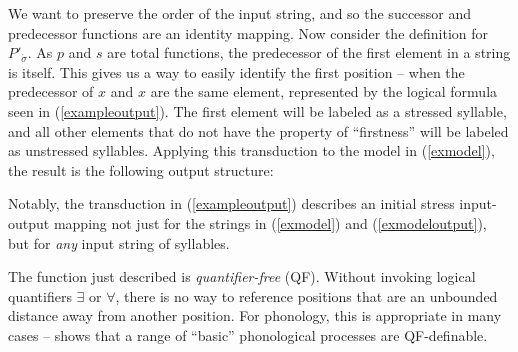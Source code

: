 \documentclass[12pt]{article}
\newcommand{\sig}{\sigma}
\newcommand{\ass}{\acute{\sig}}
\begin{document}
We want to preserve the order of the input string, and so the successor and predecessor functions are an identity mapping. Now consider the definition for $P'_\ass$. As $p$ and $s$ are total functions, the predecessor of the first element in a string is itself. This gives us a way to easily identify the first position -- when the predecessor of $x$ and $x$ are the same element, represented by the logical formula seen in (\ref{exampleoutput}). The first element will be labeled as a stressed syllable, and all other elements that do not have the property of ``firstness'' will be labeled as unstressed syllables. Applying this transduction to the model in (\ref{exmodel}), the result is the following output structure: 

\begin{exe}
\item 

 \label{exmodeloutput}
\end{exe}

\noindent
Notably, the transduction in (\ref{exampleoutput}) describes an initial stress input-output mapping not just for the strings in (\ref{exmodel}) and (\ref{exmodeloutput}), but for \textit{any} input string of syllables. 

The function just described is \textit{quantifier-free} (QF). Without invoking logical quantifiers $\exists$ or $\forall$, there is no way to reference positions that are an unbounded distance away from another position. For phonology, this is appropriate in many cases -- \citet{chandlee14} shows that a range of ``basic'' phonological processes are QF-definable. 
\end{document}
